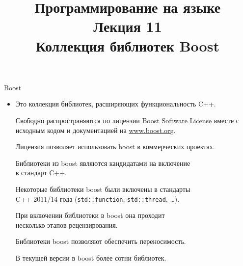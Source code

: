 \documentclass[aspectration=1610,t]{beamer}
\title{{\bf Программирование на языке \langcpp\protect\\Лекция
11\protect\vspace{1em}\\}Коллекция библиотек Boost}
\begin{document}
\begin{frame} 
  \titlepage
\end{frame}

\begin{frame}[fragile]{Boost}
    \begin{itemize}
        \item Это коллекция библиотек, расширяющих функциональность C++.

        \pitem Свободно распространяются по лицензии Boost Software License вместе с исходным кодом и документацией на 
        \url{www.boost.org}. 
        
        \pitem Лицензия позволяет использовать boost в коммерческих проектах.

        \pitem Библиотеки из boost являются кандидатами
            на включение\\ в стандарт C++.

        \pitem Некоторые библиотеки boost были включены в стандарты\\ C++ 2011/14 года (\texttt{std::function}, \texttt{std::thread}, \ldots).

        \pitem При включении библиотеки в boost она проходит\\ несколько этапов
            рецензирования.
            
        \pitem Библиотеки boost позволяют обеспечить переносимость.

        \pitem В текущей версии в boost более сотни библиотек.

    \end{itemize}
\end{frame}
\end{document}
